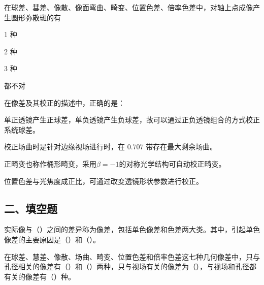 \documentclass[padl, analysis, notocnum]{ExBook}
\newcommand{\answerarea}[1][3.5cm]{%
  \par\vspace{1mm}%
  \noindent{\color{themeColor!35}\rule{\linewidth}{0.4pt}}\par
  \noindent\begin{minipage}[t][#1][t]{\linewidth}\vspace{0pt}\end{minipage}\par
  \noindent{\color{themeColor!35}\rule{\linewidth}{0.4pt}}\par
}
\begin{document}
\begin{qitems}[startnum=5]
\qitem 在球差、彗差、像散、像面弯曲、畸变、位置色差、倍率色差中，对轴上点成像产生圆形弥散斑的有
\par\noindent\hspace{2em}1 种
\par\noindent\hspace{2em}2 种
\par\noindent\hspace{2em}3 种
\par\noindent\hspace{2em}都不对
\label{q:112:start}
\answerarea[4.0cm]
\label{q:112:end}
\end{qitems}

\begin{qitems}[startnum=6]
\qitem 在像差及其校正的描述中，正确的是：
\par\noindent\hspace{2em}单正透镜产生正球差，单负透镜产生负球差，故可以通过正负透镜组合的方式校正系统球差。
\par\noindent\hspace{2em}校正场曲时是针对边缘视场进行时，在 0.707 带存在最大剩余场曲。
\par\noindent\hspace{2em}正畸变也称作桶形畸变，采用$\beta =-1$的对称光学结构可自动校正畸变。
\par\noindent\hspace{2em}位置色差与光焦度成正比，可通过改变透镜形状参数进行校正。
\label{q:113:start}
\answerarea[4.0cm]
\label{q:113:end}
\end{qitems}

\subsection{二、填空题}
\begin{qitems}[startnum=1]
\qitem 实际像与（\hspace{1.6em}）之间的差异称为像差，包括单色像差和色差两大类。其中，引起单色像差的主要原因是（\hspace{1.6em}）和（\hspace{1.6em}）。
\label{q:114:start}
\answerarea[4.0cm]
\label{q:114:end}
\end{qitems}

\begin{qitems}[startnum=2]
\qitem 在球差、慧差、像散、场曲、畸变、位置色差和倍率色差这七种几何像差中，只与孔径相关的像差有（\hspace{1.6em}）和（\hspace{1.6em}）两种，只与视场有关的像差为（\hspace{1.6em}），与视场和孔径都有关的像差有（\hspace{1.6em}）种。
\label{q:115:start}
\answerarea[4.0cm]
\label{q:115:end}
\end{qitems}
\end{document}
